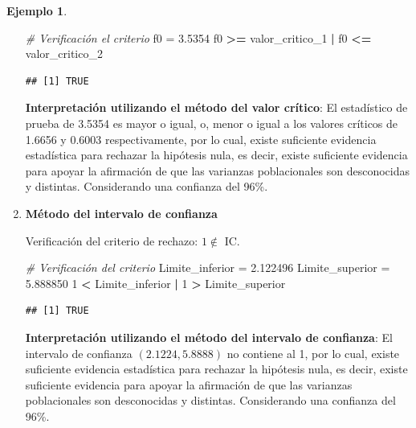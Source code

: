 \documentclass[
  11pt,
]{book}
\newenvironment{Shaded}{\begin{snugshade}}{\end{snugshade}}
\newcommand{\CommentTok}[1]{\textcolor[rgb]{0.56,0.35,0.01}{\textit{#1}}}
\newcommand{\DecValTok}[1]{\textcolor[rgb]{0.00,0.00,0.81}{#1}}
\newcommand{\FloatTok}[1]{\textcolor[rgb]{0.00,0.00,0.81}{#1}}
\newcommand{\NormalTok}[1]{#1}
\newcommand{\OtherTok}[1]{\textcolor[rgb]{0.56,0.35,0.01}{#1}}
\newcommand{\SpecialCharTok}[1]{\textcolor[rgb]{0.81,0.36,0.00}{\textbf{#1}}}
\theoremstyle{definition}
\theoremstyle{definition}
\newtheorem{example}{Ejemplo}[chapter]
\theoremstyle{definition}
\theoremstyle{definition}
\theoremstyle{remark}
\begin{document}
\begin{example}
\begin{enumerate}
\begin{Shaded}
\begin{Highlighting}[]
\CommentTok{\# Verificación el criterio}
\NormalTok{f0 }\OtherTok{=} \FloatTok{3.5354}
\NormalTok{f0 }\SpecialCharTok{\textgreater{}=}\NormalTok{ valor\_critico\_1 }\SpecialCharTok{|}\NormalTok{ f0 }\SpecialCharTok{\textless{}=}\NormalTok{ valor\_critico\_2}
\end{Highlighting}
\end{Shaded}

\begin{verbatim}
## [1] TRUE
\end{verbatim}

  \textbf{Interpretación utilizando el método del valor crítico}: El estadístico de prueba de 3.5354 es mayor o igual, o, menor o igual a los valores críticos de 1.6656 y 0.6003 respectivamente, por lo cual, existe suficiente evidencia estadística para rechazar la hipótesis nula, es decir, existe suficiente evidencia para apoyar la afirmación de que las varianzas poblacionales son desconocidas y distintas. Considerando una confianza del 96\%.
\item
  \textbf{Método del intervalo de confianza}

  Verificación del criterio de rechazo: \(1 \notin\) IC.

\begin{Shaded}
\begin{Highlighting}[]
\CommentTok{\# Verificación del criterio}
\NormalTok{Limite\_inferior }\OtherTok{=} \FloatTok{2.122496}
\NormalTok{Limite\_superior }\OtherTok{=} \FloatTok{5.888850}
\DecValTok{1} \SpecialCharTok{\textless{}}\NormalTok{ Limite\_inferior }\SpecialCharTok{|} \DecValTok{1} \SpecialCharTok{\textgreater{}}\NormalTok{ Limite\_superior}
\end{Highlighting}
\end{Shaded}

\begin{verbatim}
## [1] TRUE
\end{verbatim}

  \textbf{Interpretación utilizando el método del intervalo de confianza}: El intervalo de confianza \((2.1224, 5.8888)\) no contiene al 1, por lo cual, existe suficiente evidencia estadística para rechazar la hipótesis nula, es decir, existe suficiente evidencia para apoyar la afirmación de que las varianzas poblacionales son desconocidas y distintas. Considerando una confianza del 96\%.
\end{enumerate}


\end{example}
\end{document}
